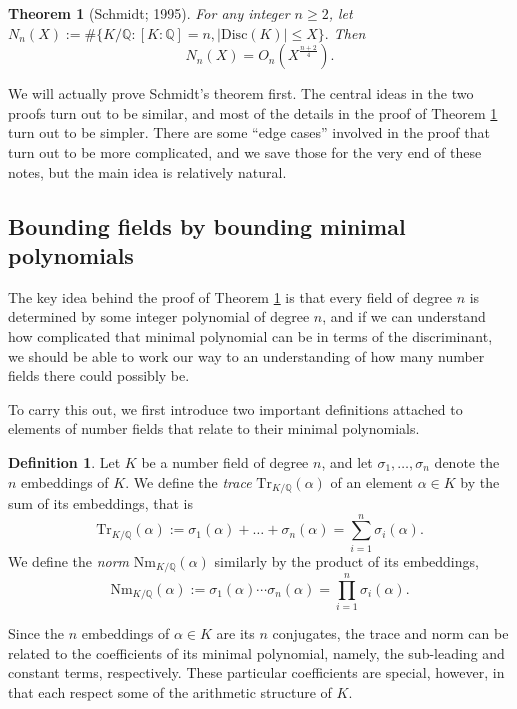 \documentclass[12pt]{amsart}
\newtheorem{theorem}{Theorem}
\theoremstyle{definition} \newtheorem*{notation}{Notation}
\theoremstyle{remark} \newtheorem*{remark}{Remark}
\theoremstyle{remark} \newtheorem*{example}{Example}
\theoremstyle{definition} \newtheorem*{definition}{Definition}
\theoremstyle{definition} \newtheorem*{question}{Question}
\numberwithin{equation}{section}
\numberwithin{theorem}{section}
\begin{document}
	\begin{theorem}[Schmidt; 1995] \label{thm:schmidt}
		For any integer $n \geq 2$, let $N_n(X) := \#\{K/\mathbb{Q} : [K:\mathbb{Q}]=n, |\mathrm{Disc}(K)| \leq X\}.$  Then
			\[
				N_n(X) = O_n(X^{\frac{n+2}{4}}).
			\]
	\end{theorem}
	
	We will actually prove Schmidt's theorem first.  The central ideas in the two proofs turn out to be similar, and most of the details in the proof of Theorem \ref{thm:schmidt} turn out to be simpler.  There are some ``edge cases'' involved in the proof that turn out to be more complicated, and we save those for the very end of these notes, but the main idea is relatively natural.
	
\subsection{Bounding fields by bounding minimal polynomials}

	The key idea behind the proof of Theorem \ref{thm:schmidt} is that every field of degree $n$ is determined by some integer polynomial of degree $n$, and if we can understand how complicated that minimal polynomial can be in terms of the discriminant, we should be able to work our way to an understanding of how many number fields there could possibly be.
	
	To carry this out, we first introduce two important definitions attached to elements of number fields that relate to their minimal polynomials.
	
	\begin{definition}
		Let $K$ be a number field of degree $n$, and let $\sigma_1,\dots,\sigma_n$ denote the $n$ embeddings of $K$.  We define the \emph{trace} $\mathrm{Tr}_{K/\mathbb{Q}}(\alpha)$ of an element $\alpha \in K$ by the sum of its embeddings, that is
			\[
				\mathrm{Tr}_{K/\mathbb{Q}}(\alpha)
					:= \sigma_1(\alpha) + \dots + \sigma_n(\alpha) = \sum_{i=1}^n \sigma_i(\alpha).
			\]
		We define the \emph{norm} $\mathrm{Nm}_{K/\mathbb{Q}}(\alpha)$ similarly by the product of its embeddings,
			\[
				\mathrm{Nm}_{K/\mathbb{Q}}(\alpha) 
					:= \sigma_1(\alpha)\cdots \sigma_n(\alpha) 
					= \prod_{i=1}^n \sigma_i(\alpha).
			\]
	\end{definition}
	
	Since the $n$ embeddings of $\alpha \in K$ are its $n$ conjugates, the trace and norm can be related to the coefficients of its minimal polynomial, namely, the sub-leading and constant terms, respectively.  These particular coefficients are special, however, in that each respect some of the arithmetic structure of $K$.
	
\end{document}
